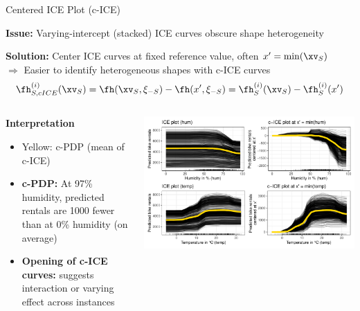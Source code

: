 \documentclass[10pt,compress,t,notes=noshow, xcolor=table]{beamer}
\begin{document}
\begin{frame}{Centered ICE Plot (c-ICE) }

\textbf{Issue:} Varying-intercept (stacked) ICE curves obscure shape heterogeneity

\textbf{Solution:} Center ICE curves at fixed reference value, often $x' = \min(\xv_S)$\\
$\Rightarrow$ Easier to identify heterogeneous shapes with c-ICE curves
$$\begin{aligned}
\fh_{S, cICE}^{(i)}(\xv_S) = \fh(\xv_S, \xi_{-S}) - \fh(x', \xi_{-S}) = \fh_{S}^{(i)}(\xv_S) - \fh_{S}^{(i)}(x')
\end{aligned}$$
\vspace{-0.2cm}
\begin{columns}[c, totalwidth=\textwidth]
\begin{column}{0.5\textwidth}
\pause
\textbf{Interpretation}%
\begin{itemize}
  \item Yellow: c-PDP (mean of c-ICE)
  \item \textbf{c-PDP:} At 97\% humidity, predicted rentals are 1000 fewer than at 0\% humidity (on average)
  \item \textbf{Opening of c-ICE curves:} suggests interaction or varying effect across instances
\end{itemize}
\end{column}
\begin{column}{0.5\textwidth}
\begin{center}
\includegraphics[width=\textwidth]{figure/cICE}

\end{center}
\end{column}
\end{columns}
\end{frame}
\end{document}

